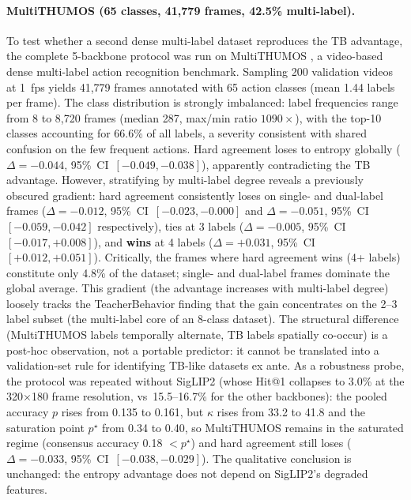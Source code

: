 \documentclass[a4paper,fleqn]{cas-sc}
\begin{document}
\paragraph{MultiTHUMOS (65 classes, 41,779 frames, 42.5\% multi-label).}
To test whether a second dense multi-label dataset reproduces the TB advantage, the complete 5-backbone protocol was run on MultiTHUMOS \citep{yeung2018every}, a video-based dense multi-label action recognition benchmark.
Sampling 200 validation videos at 1~fps yields 41,779 frames annotated with 65 action classes (mean 1.44 labels per frame).
The class distribution is strongly imbalanced: label frequencies range from 8 to 8,720 frames (median 287, max/min ratio $1090\times$), with the top-10 classes accounting for 66.6\% of all labels, a severity consistent with shared confusion on the few frequent actions.
Hard agreement loses to entropy globally ($\Delta = -0.044$, 95\%~CI~$[-0.049,-0.038]$), apparently contradicting the TB advantage.
However, stratifying by multi-label degree reveals a previously obscured gradient: hard agreement consistently loses on single- and dual-label frames ($\Delta = -0.012$, 95\%~CI~$[-0.023,-0.000]$ and $\Delta = -0.051$, 95\%~CI~$[-0.059,-0.042]$ respectively), ties at 3 labels ($\Delta = -0.005$, 95\%~CI~$[-0.017,+0.008]$), and \textbf{wins} at 4 labels ($\Delta = +0.031$, 95\%~CI~$[+0.012,+0.051]$).
Critically, the frames where hard agreement wins (4+ labels) constitute only 4.8\% of the dataset; single- and dual-label frames dominate the global average.
This gradient (the advantage increases with multi-label degree) loosely tracks the TeacherBehavior finding that the gain concentrates on the 2--3 label subset (the multi-label core of an 8-class dataset).
The structural difference (MultiTHUMOS labels temporally alternate, TB labels spatially co-occur) is a post-hoc observation, not a portable predictor: it cannot be translated into a validation-set rule for identifying TB-like datasets ex ante.
As a robustness probe, the protocol was repeated without SigLIP2 (whose Hit@1 collapses to 3.0\% at the 320$\times$180 frame resolution, vs~15.5--16.7\% for the other backbones): the pooled accuracy $p$ rises from 0.135 to 0.161, but $\kappa$ rises from 33.2 to 41.8 and the saturation point $p^\star$ from 0.34 to 0.40, so MultiTHUMOS remains in the saturated regime (consensus accuracy 0.18 $< p^\star$) and hard agreement still loses ($\Delta = -0.033$, 95\%~CI~$[-0.038,-0.029]$).
The qualitative conclusion is unchanged: the entropy advantage does not depend on SigLIP2's degraded features.
\end{document}
